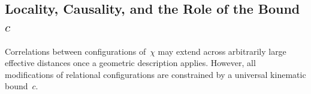 \subsection{Locality, Causality, and the Role of the Bound
\texorpdfstring{$c$}{c}}
\label{subsec:locality-causality-and-the-role-of-the-bound-c}

Correlations between configurations of~$\chi$ may extend across
arbitrarily large effective distances once a geometric description
applies.
However, all modifications of relational configurations are constrained
by a universal kinematic bound~$c$.
